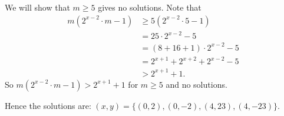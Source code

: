 \documentclass[problems.tex]{subfile}
\begin{document}
\begin{solution}
\begin{enumerate}
			We will show that $m \ge 5$ gives no solutions. Note that
			\begin{align*}
			m(2^{x - 2} \cdot m - 1) & \ge 5(2^{x - 2} \cdot 5 - 1) \\
			& = 25 \cdot 2^{x - 2} - 5 \\
			& = (8 + 16 + 1) \cdot 2^{x - 2} - 5  \\
			& = 2^{x + 1} + 2^{x + 2} + 2^{x - 2} - 5 \\
			& > 2^{x + 1} + 1.
			\end{align*}
			So $m(2^{x - 2} \cdot m - 1) > 2^{x + 1} + 1$ for $m \ge 5$ and no solutions.
		\end{enumerate}
		Hence the solutions are: $(x,  y) = \{(0,  2), (0, -2), (4,  23),  (4, -23)\}$.
	\end{solution}

%
\end{document}
